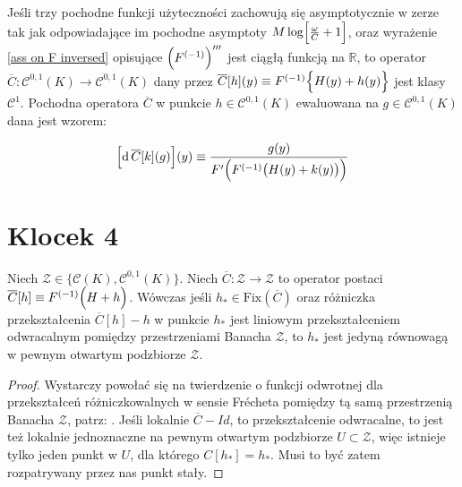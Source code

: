 \begin{tw}
	Jeśli trzy pochodne funkcji użyteczności zachowują się asymptotycznie w zerze tak jak odpowiadające im pochodne asymptoty $ M \log \Bigl[ \frac{\omega}{C} + 1 \Bigl]  $, oraz wyrażenie \ref{ass on F inversed} opisujące $ \Bigl(F^{(-1)}\Bigl)''' $ jest ciągłą funkcją na $ \mathbb{R} $, to operator $ \overline{C}: \mathcal{C}^{0,1}(K) \rightarrow \mathcal{C}^{0,1}(K)   $ dany przez $ \overline{C}[h](y) \equiv F^{(-1)} \Bigl \{ H(y) + h(y) \Bigl \} $ jest klasy $ \mathcal{C}^{1} $. Pochodna operatora $ \overline{C} $ w punkcie $ h \in \mathcal{C}^{0,1}(K)   $ ewaluowana na $ g \in \mathcal{C}^{0,1}(K) $ dana jest wzorem:
	
\begin{equation}
\Bigl[\mathrm{d}\, \overline{C}[k](g)\Bigl] (y) \equiv \frac{g(y)}{F'\Bigl( F^{(-1)}\bigl( H(y) + k(y)\bigl) \Bigl)} 
\end{equation}	
\end{tw}




\section*{Klocek 4}

\begin{wniosek}
	Niech $\mathcal{Z} \in \Big\{\mathcal{C}(K), \mathcal{C}^{0,1}(K)\Big\}$. Niech $\overline{C}: \mathcal{Z} \rightarrow \mathcal{Z}$ to operator postaci $\overline{C}[h] \equiv F^{(-1)}\Bigl(H + h \Bigl)$. Wówczas jeśli $h_{*} \in \mathrm{Fix}(\overline{C})$ oraz różniczka przekształcenia $\overline{C}[h] - h$ w punkcie $h_{*}$ jest liniowym przekształceniem odwracalnym pomiędzy przestrzeniami Banacha $\mathcal{Z}$, to $h_{*}$ jest jedyną równowagą w pewnym otwartym podzbiorze $\mathcal{Z}$.   		
\end{wniosek}

\begin{proof}
	Wystarczy powołać się na twierdzenie o funkcji odwrotnej dla przekształceń różniczkowalnych w sensie Fr\' echeta pomiędzy tą samą przestrzenią Banacha $\mathcal{Z}$, patrz: \citet[][twr. VIII.2.7., str. 213]{Maurin}. Jeśli lokalnie $\overline{C} - Id$, to przekształcenie odwracalne, to jest też lokalnie jednoznaczne na pewnym otwartym podzbiorze $U \subset \mathcal{Z}$, więc istnieje tylko jeden punkt w $U$, dla którego $C[h_{*}] = h_{*}$. Musi to być zatem rozpatrywany przez nas punkt stały.
\end{proof}



